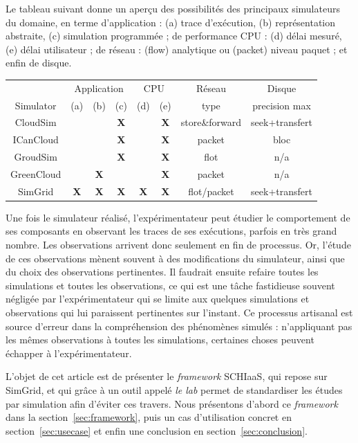 \documentclass[parallelisme]{compas2017}
\begin{document}
Le tableau suivant
donne un aperçu des possibilités des principaux simulateurs du domaine, en 
terme d'application : (a) trace d'exécution, (b) représentation abstraite, (c) 
simulation  programmée ; de performance CPU : (d) délai mesuré, (e) délai
utilisateur ; de réseau : (flow) analytique ou (packet) niveau paquet ; et 
enfin de disque.

\begin{center}
\begin{tabular}{|c||c|c|c||c|c|c|c|}
	\hline
	& \multicolumn{3}{c|}{Application} &
	\multicolumn{2}{c|}{CPU}&Réseau&Disque\\
	\cline{2-8}
	Simulator &(a) 
                  &(b)
                  &(c)
                  &(d)
                  &(e)&
	type & precision max\\
	\hline
	CloudSim\cite{cloudsim} & & & \bf X &&\bf
	X&store\&forward&seek+transfert\\ \hline
	ICanCloud\cite{icancloud} & & & \bf X &&\bf X&packet& bloc \\ \hline
	GroudSim\cite{groudsim} & & & \bf X &&\bf X&flot& n/a\\\hline
	GreenCloud\cite{greencloud} & & \bf X &&&\bf X&packet& n/a\\ \hline
	SimGrid\cite{simgrid}& \bf X & \bf X & \bf X &\bf X&\bf X& flot/packet &
	seek+transfert \\
	\hline
\end{tabular}
\end{center}

Une fois le simulateur réalisé, l'expérimentateur peut étudier le 
comportement de ses composants en observant les traces de ses exécutions, 
parfois en très grand nombre. Les observations arrivent donc seulement en fin 
de processus. Or, l'étude de ces observations mènent souvent à des 
modifications du simulateur, ainsi que du choix des observations pertinentes. Il 
faudrait ensuite refaire toutes les simulations et toutes les observations, ce 
qui est une tâche fastidieuse souvent négligée par l'expérimentateur qui se 
limite aux quelques simulations et observations qui lui paraissent pertinentes 
sur l'instant. Ce processus artisanal est source d'erreur dans la compréhension 
des phénomènes simulés : n'appliquant pas les mêmes observations à toutes les 
simulations, certaines choses peuvent échapper à l'expérimentateur.

L'objet  de cet  article est  de  présenter le  \textit{framework} SCHIaaS,  qui
repose sur  SimGrid, et  qui grâce  à un  outil appelé  \emph{le lab}  permet de
standardiser  les  études  par  simulation  afin  d'éviter  ces  travers.   Nous
présentons  d'abord ce  \textit{framework} dans  la section~\ref{sec:framework},
puis  un cas  d'utilisation concret  en section~\ref{sec:usecase}  et enfin  une
conclusion en section~\ref{sec:conclusion}.
\end{document}
